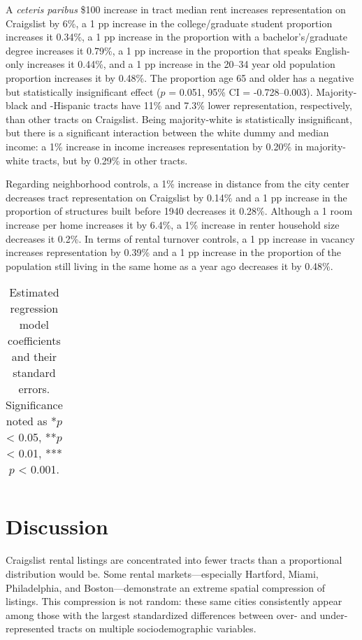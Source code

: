 \documentclass[12pt,onecolumn]{article} %
\begin{document}
A \textit{ceteris paribus} \$100 increase in tract median rent increases representation on Craigslist by 6\%, a 1 pp increase in the college/graduate student proportion increases it 0.34\%, a 1 pp increase in the proportion with a bachelor's/graduate degree increases it 0.79\%, a 1 pp increase in the proportion that speaks English-only increases it 0.44\%, and a 1 pp increase in the 20--34 year old population proportion increases it by 0.48\%. The proportion age 65 and older has a negative but statistically insignificant effect ($p$ = 0.051, 95\% CI = -0.728--0.003). Majority-black and -Hispanic tracts have 11\% and 7.3\% lower representation, respectively, than other tracts on Craigslist. Being majority-white is statistically insignificant, but there is a significant interaction between the white dummy and median income: a 1\% increase in income increases representation by 0.20\% in majority-white tracts, but by 0.29\% in other tracts.

Regarding neighborhood controls, a 1\% increase in distance from the city center decreases tract representation on Craigslist by 0.14\% and a 1 pp increase in the proportion of structures built before 1940 decreases it 0.28\%. Although a 1 room increase per home increases it by 6.4\%, a 1\% increase in renter household size decreases it 0.2\%. In terms of rental turnover controls, a 1 pp increase in vacancy increases representation by 0.39\% and a 1 pp increase in the proportion of the population still living in the same home as a year ago decreases it by 0.48\%.

\begin{small}
\begin{longtable}{l r r} 
	\caption{Estimated regression model coefficients and their standard errors. Significance noted as *$p$ < 0.05, **$p$ < 0.01, ***$p$ < 0.001.}
	\label{tab:regression_results}
	
\end{longtable}
\end{small}


\section{Discussion}

Craigslist rental listings are concentrated into fewer tracts than a proportional distribution would be. Some rental markets---especially Hartford, Miami, Philadelphia, and Boston---demonstrate an extreme spatial compression of listings. This compression is not random: these same cities consistently appear among those with the largest standardized differences between over- and under-represented tracts on multiple sociodemographic variables.
\end{document}
